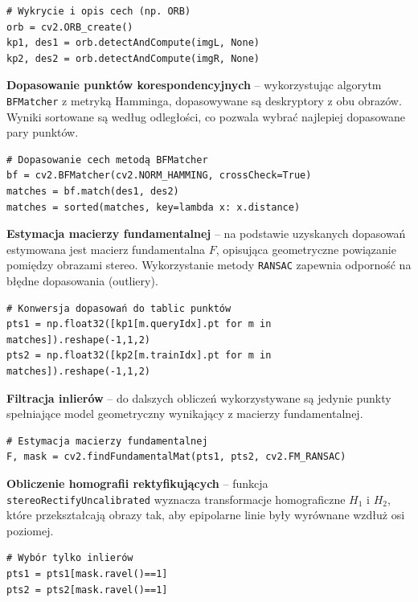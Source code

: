 \documentclass[magisterska]{pracadypl}
\begin{document}
\begin{lstlisting}[style=mypython]
# Wykrycie i opis cech (np. ORB)
orb = cv2.ORB_create()
kp1, des1 = orb.detectAndCompute(imgL, None)
kp2, des2 = orb.detectAndCompute(imgR, None)
\end{lstlisting}

\textbf{Dopasowanie punktów korespondencyjnych} – wykorzystując algorytm \texttt{BFMatcher} z metryką Hamminga, dopasowywane są deskryptory z obu obrazów. Wyniki sortowane są według odległości, co pozwala wybrać najlepiej dopasowane pary punktów.

\begin{lstlisting}[style=mypython]
# Dopasowanie cech metodą BFMatcher
bf = cv2.BFMatcher(cv2.NORM_HAMMING, crossCheck=True)
matches = bf.match(des1, des2)
matches = sorted(matches, key=lambda x: x.distance)
\end{lstlisting}

\textbf{Estymacja macierzy fundamentalnej} – na podstawie uzyskanych dopasowań estymowana jest macierz fundamentalna $F$, opisująca geometryczne powiązanie pomiędzy obrazami stereo. Wykorzystanie metody \texttt{RANSAC} zapewnia odporność na błędne dopasowania (outliery).

\begin{lstlisting}[style=mypython]
# Konwersja dopasowań do tablic punktów
pts1 = np.float32([kp1[m.queryIdx].pt for m in matches]).reshape(-1,1,2)
pts2 = np.float32([kp2[m.trainIdx].pt for m in matches]).reshape(-1,1,2)
\end{lstlisting}

\textbf{Filtracja inlierów} – do dalszych obliczeń wykorzystywane są jedynie punkty spełniające model geometryczny wynikający z macierzy fundamentalnej.

\begin{lstlisting}[style=mypython]
# Estymacja macierzy fundamentalnej
F, mask = cv2.findFundamentalMat(pts1, pts2, cv2.FM_RANSAC)
\end{lstlisting}

\textbf{Obliczenie homografii rektyfikujących} – funkcja \texttt{stereoRectifyUncalibrated} wyznacza transformacje homograficzne $H_1$ i $H_2$, które przekształcają obrazy tak, aby epipolarne linie były wyrównane wzdłuż osi poziomej.

\begin{lstlisting}[style=mypython]
# Wybór tylko inlierów
pts1 = pts1[mask.ravel()==1]
pts2 = pts2[mask.ravel()==1]
\end{lstlisting}
\end{document}
